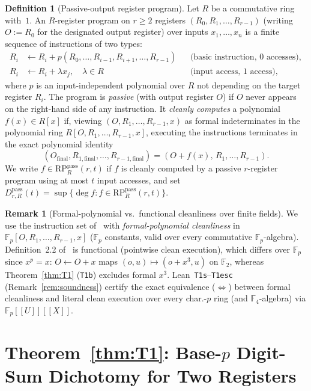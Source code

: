 \documentclass[11pt,reqno]{amsart}
\theoremstyle{definition}
\newtheorem{definition}[theorem]{Definition}
\newtheorem{remark}[theorem]{Remark}
\newcommand{\F}{\mathbb{F}}
\newcommand{\RP}{\mathrm{RP}}
\newcommand{\pass}{\mathrm{pass}}
\begin{document}
\begin{definition}[Passive-output register program]
\label{def:rp}
Let $R$ be a commutative ring with~$1$.
An $R$-register program on $r \ge 2$ registers $(R_0, R_1, \dots, R_{r-1})$ (writing $O := R_0$ for the designated output register) over inputs $x_1, \dots, x_n$ is a finite sequence of instructions of two types:
\begin{align*}
  R_i &\leftarrow R_i + p(R_0, \dots, R_{i-1}, R_{i+1}, \dots, R_{r-1}) && \text{(basic instruction, $0$ accesses)}, \\
  R_i &\leftarrow R_i + \lambda x_j,\quad \lambda \in R && \text{(input access, $1$ access)},
\end{align*}
where $p$ is an input-independent polynomial over $R$ not depending on the target register $R_i$.
The program is \emph{passive} (with output register $O$) if $O$ never appears on the right-hand side of any instruction.
It \emph{cleanly computes} a polynomial $f(x) \in R[x]$ if, viewing $(O, R_1, \dots, R_{r-1}, x)$ as formal indeterminates in the polynomial ring $R[O, R_1, \dots, R_{r-1}, x]$, executing the instructions terminates in the exact polynomial identity
\[
  (O_{\mathrm{final}}, R_{1,\mathrm{final}}, \dots, R_{r-1,\mathrm{final}}) = (O + f(x),\, R_1, \dots, R_{r-1}).
\]
We write $f \in \RP_R^{\pass}(r, t)$ if $f$ is cleanly computed by a passive $r$-register program using at most $t$ input accesses, and set $D_{r, R}^{\pass}(t) = \sup\{\deg f : f \in \RP_R^{\pass}(r, t)\}$.
\end{definition}

\begin{remark}[Formal-polynomial vs.\ functional cleanliness over finite fields]
We use the instruction set of~\cite[Definition~2.2]{Vinciguerra2026} with \emph{formal-polynomial cleanliness} in $\F_p[O, R_1, \dots, R_{r-1}, x]$ ($\F_p$ constants, valid over every commutative $\F_p$-algebra).
Definition~2.2 of~\cite{Vinciguerra2026} is functional (pointwise clean execution), which differs over $\F_p$ since $x^p = x$: $O \leftarrow O + x$ maps $(o, u) \mapsto (o + x^3, u)$ on $\F_2$, whereas Theorem~\ref{thm:T1} (\texttt{T1b}) excludes formal $x^3$.
Lean~\texttt{T1s}--\texttt{T1esc} (Remark~\ref{rem:soundness}) certify the exact equivalence ($\Leftrightarrow$) between formal cleanliness and literal clean execution over every char.-$p$ ring (and $\F_4$-algebra) via $\F_p[[U]][[X]]$.
\end{remark}

\section{Theorem~\ref{thm:T1}: Base-\texorpdfstring{$p$}{p} Digit-Sum Dichotomy for Two Registers}
\label{sec:T1}
\end{document}

